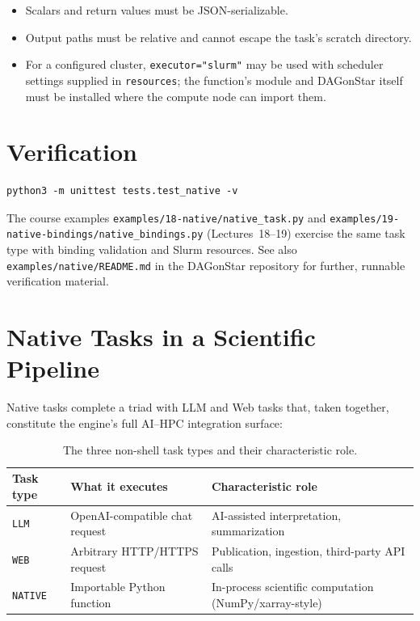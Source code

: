 \begin{itemize}[leftmargin=1.4em]
  \item Scalars and return values must be JSON-serializable.
  \item Output paths must be relative and cannot escape the task's scratch
    directory.
  \item For a configured cluster, \texttt{executor="slurm"} may be used with
    scheduler settings supplied in \texttt{resources}; the function's module
    and DAGonStar itself must be installed where the compute node can import
    them.
\end{itemize}

\section{Verification}

\begin{lstlisting}[style=bash]
python3 -m unittest tests.test_native -v
\end{lstlisting}

The course examples \texttt{examples/18-native/native\_task.py} and
\texttt{examples/19-native-bindings/native\_bindings.py} (Lectures~18--19)
exercise the same task type with binding validation and Slurm resources.
See also \texttt{examples/native/README.md} in the DAGonStar repository for further,
runnable verification material.

\section{Native Tasks in a Scientific Pipeline}

Native tasks complete a triad with LLM and Web tasks that, taken together,
constitute the engine's full AI--HPC integration surface:

\begin{table}[h]
\centering
\caption{The three non-shell task types and their characteristic role.}
\label{tab:ai-hpc-triad}
\begin{tabular}{@{}lll@{}}
\toprule
\textbf{Task type} & \textbf{What it executes} & \textbf{Characteristic role} \\
\midrule
\texttt{LLM}    & OpenAI-compatible chat request & AI-assisted interpretation, summarization \\
\texttt{WEB}    & Arbitrary HTTP/HTTPS request   & Publication, ingestion, third-party API calls \\
\texttt{NATIVE} & Importable Python function     & In-process scientific computation (NumPy/xarray-style) \\
\bottomrule
\end{tabular}
\end{table}

